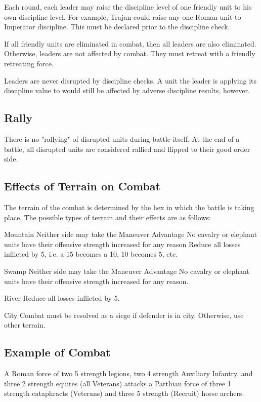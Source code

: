 Each round, each leader may raise the discipline level of one friendly unit to his own discipline level. For example, Trajan could raise any one Roman unit to Imperator discipline. This must be declared prior to the discipline check.

If all friendly units are eliminated in combat, then all leaders are also eliminated. Otherwise, leaders are not affected by combat. They must retreat with a friendly retreating force.

Leaders are never disrupted by discipline checks. A unit the leader is applying its discipline value to would still be affected by adverse discipline results, however.

\subsection{Rally}

There is no "rallying" of disrupted units during battle itself. At the end of a battle, all disrupted units are considered rallied and flipped to their good order side.

\subsection{Effects of Terrain on Combat}

The terrain of the combat is determined by the hex in which the battle is taking place. The possible types of terrain and their effects are as follows:

Mountain
Neither side may take the Maneuver Advantage
No cavalry or elephant units have their offensive strength increased for any reason
Reduce all losses inflicted by 5, i.e. a 15 becomes a 10, 10 becomes 5, etc.

Swamp
Neither side may take the Maneuver Advantage
No cavalry or elephant units have their offensive strength increased for any reason.

River
Reduce all losses inflicted by 5.

City
Combat must be resolved as a siege if defender is in city. Otherwise, use other terrain.

\subsection{Example of Combat}

A Roman force of two 5 strength legions, two 4 strength Auxiliary Infantry, and three 2 strength equites (all Veterans) attacks a Parthian force of three 1 strength cataphracts (Veterans) and three 5 strength (Recruit) horse archers.

